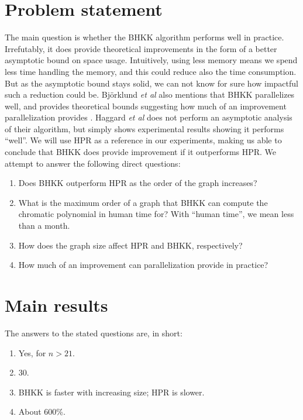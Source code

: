 \documentclass{cslthse-msc}
\begin{document}
\section{Problem statement}
The main question is whether the BHKK algorithm performs well in practice. Irrefutably, it does provide theoretical improvements in the form of a better asymptotic bound on space usage. Intuitively, using less memory means we spend less time handling the memory, and this could reduce also the time consumption. But as the asymptotic bound stays solid, we can not know for sure how impactful such a reduction could be. Björklund \emph{et al} also mentions that BHKK parallelizes well, and provides theoretical bounds suggesting how much of an improvement parallelization provides \cite[p.10]{cov_pack}. Haggard \emph{et al} does not perform an asymptotic analysis of their algorithm, but simply shows experimental results showing it performs ``well''. We will use HPR as a reference in our experiments, making us able to conclude that BHKK does provide improvement if it outperforms HPR. We attempt to answer the following direct questions:

\begin{enumerate}
 \item Does BHKK outperform HPR as the order of the graph increases? \label{ngrow}
 \item What is the maximum order of a graph that BHKK can compute the chromatic polynomial in human time for? \label{maxn}
 \subitem With ``human time'', we mean less than a month.
 \item How does the graph size affect HPR and BHKK, respectively? \label{mgrow}
 \item How much of an improvement can parallelization provide in practice? \label{parallel}
\end{enumerate}

\section{Main results}
The answers to the stated questions are, in short:

\begin{enumerate}
 \item Yes, for $n > 21$.
 \item 30.
 \item BHKK is faster with increasing size; HPR is slower.
 \item About 600\%.
\end{enumerate}
\end{document}
